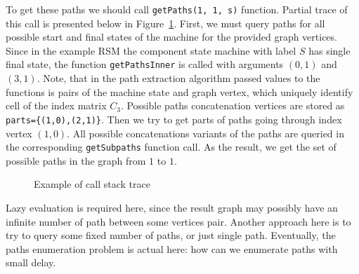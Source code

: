 To get these paths we should call \verb|getPaths(1, 1, s)| function.
Partial trace of this call is presented below in Figure~\ref{trc:example}.
First, we must query paths for all possible start and final states of the
machine for the provided graph vertices. Since in the example RSM the component
state machine with label $S$ has single final state, the function
\verb|getPathsInner| is called with arguments $(0,1)$ and $(3,1)$.
Note, that in the path extraction algorithm passed values to the functions is
pairs of the machine state and graph vertex, which uniquely identify cell of
the index matrix $C_3$. Possible paths concatenation vertices are stored as \verb|parts={(1,0),(2,1)}|. Then we try to get parts of paths going through
index vertex $(1,0)$. All possible concatenations variants of the paths are
queried in the corresponding \verb|getSubpaths| function call. As the result,
we get the set of possible paths in the graph from $1$ to $1$.

\begin{figure}
\begin{minipage}[t]{0.48\textwidth}
{
\scriptsize
\setlength{\DTbaselineskip}{8pt}
\DTsetlength{0.2em}{0.5em}{0.2em}{0.4pt}{1.6pt}
}
\caption{Example of call stack trace}
\label{trc:example}
\end{minipage}
\end{figure}

Lazy evaluation is required here, since the result graph may possibly have an
infinite number of path between some vertices pair. Another approach here is
to try to query some fixed number of paths, or just single path. Eventually,
the paths enumeration problem is actual here: how can we enumerate paths with small delay.